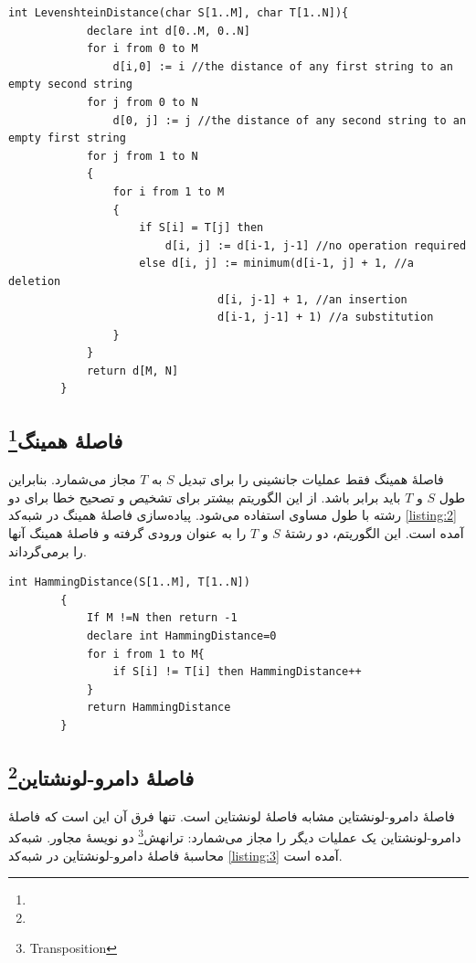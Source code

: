 \documentclass[12pt,onecolumn,a4paper]{article}
\begin{document}
    \begin{LTR}
        \begin{lstlisting}[style=C++Style,caption=\rl{فاصلۀ لونشتاین}, label={listing:1}]
        int LevenshteinDistance(char S[1..M], char T[1..N]){
            declare int d[0..M, 0..N]
            for i from 0 to M
                d[i,0] := i //the distance of any first string to an empty second string
            for j from 0 to N
                d[0, j] := j //the distance of any second string to an empty first string
            for j from 1 to N
            {
                for i from 1 to M
                {
                    if S[i] = T[j] then
                        d[i, j] := d[i-1, j-1] //no operation required
                    else d[i, j] := minimum(d[i-1, j] + 1, //a deletion
                                d[i, j-1] + 1, //an insertion
                                d[i-1, j-1] + 1) //a substitution
                }
            }
            return d[M, N]
        }
        \end{lstlisting}
    \end{LTR}

    \subsection{فاصلۀ همینگ\protect\footnote{}}
    فاصلۀ همینگ  فقط عملیات جانشینی را برای تبدیل $S$ به $T$ مجاز می‌شمارد. بنابراین طول $S$ و $T$ باید برابر باشد. از این الگوریتم بیشتر برای تشخیص و تصحیح خطا برای دو رشته با طول مساوی استفاده می‌شود. پیاده‌سازی فاصلۀ همینگ در شبه‌کد \ref{listing:2} آمده است. این الگوریتم، دو رشتۀ $S$ و $T$ را به عنوان ورودی گرفته و فاصلۀ همینگ آنها را برمی‌گرداند.

    \begin{LTR}
        \begin{lstlisting}[style=C++Style,caption=\rl{فاصلۀ همینگ}, label={listing:2}]
        int HammingDistance(S[1..M], T[1..N])
        {
            If M !=N then return -1
            declare int HammingDistance=0
            for i from 1 to M{
                if S[i] != T[i] then HammingDistance++
            }
            return HammingDistance
        }
        \end{lstlisting}
    \end{LTR}

    \subsection{فاصلۀ دامرو-لونشتاین\protect\footnote{}}
    فاصلۀ دامرو-لونشتاین  مشابه فاصلۀ لونشتاین است. تنها فرق آن این است که فاصلۀ دامرو-لونشتاین یک عملیات دیگر را مجاز می‌شمارد: ترانهش\footnote{Transposition}  دو نویسۀ مجاور. شبه‌کد محاسبۀ فاصلۀ دامرو-لونشتاین در شبه‌کد \ref{listing:3} آمده است.
\end{document}

